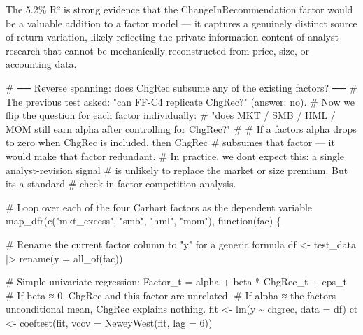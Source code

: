 \documentclass[
  letterpaper,
  DIV=11,
  numbers=noendperiod]{scrartcl}
\newenvironment{Shaded}{\begin{snugshade}}{\end{snugshade}}
\newcommand{\AttributeTok}[1]{\textcolor[rgb]{0.40,0.45,0.13}{#1}}
\newcommand{\CommentTok}[1]{\textcolor[rgb]{0.37,0.37,0.37}{#1}}
\newcommand{\ControlFlowTok}[1]{\textcolor[rgb]{0.00,0.23,0.31}{#1}}
\newcommand{\DecValTok}[1]{\textcolor[rgb]{0.68,0.00,0.00}{#1}}
\newcommand{\FunctionTok}[1]{\textcolor[rgb]{0.28,0.35,0.67}{#1}}
\newcommand{\NormalTok}[1]{\textcolor[rgb]{0.00,0.23,0.31}{#1}}
\newcommand{\OtherTok}[1]{\textcolor[rgb]{0.00,0.23,0.31}{#1}}
\newcommand{\SpecialCharTok}[1]{\textcolor[rgb]{0.37,0.37,0.37}{#1}}
\newcommand{\StringTok}[1]{\textcolor[rgb]{0.13,0.47,0.30}{#1}}
\begin{document}
The 5.2\% R² is strong evidence that the ChangeInRecommendation factor
would be a valuable addition to a factor model --- it captures a
genuinely distinct source of return variation, likely reflecting the
private information content of analyst research that cannot be
mechanically reconstructed from price, size, or accounting data.

\begin{Shaded}
\begin{Highlighting}[]
\CommentTok{\# ── Reverse spanning: does ChgRec subsume any of the existing factors? ──}
\CommentTok{\# The previous test asked: "can FF{-}C4 replicate ChgRec?" (answer: no).}
\CommentTok{\# Now we flip the question for each factor individually:}
\CommentTok{\# "does MKT / SMB / HML / MOM still earn alpha after controlling for ChgRec?"}
\CommentTok{\#}
\CommentTok{\# If a factor\textquotesingle{}s alpha drops to zero when ChgRec is included, then ChgRec}
\CommentTok{\# subsumes that factor — it would make that factor redundant.}
\CommentTok{\# In practice, we don\textquotesingle{}t expect this: a single analyst{-}revision signal}
\CommentTok{\# is unlikely to replace the market or size premium. But it\textquotesingle{}s a standard}
\CommentTok{\# check in factor competition analysis.}

\CommentTok{\# Loop over each of the four Carhart factors as the dependent variable}
\FunctionTok{map\_dfr}\NormalTok{(}\FunctionTok{c}\NormalTok{(}\StringTok{"mkt\_excess"}\NormalTok{, }\StringTok{"smb"}\NormalTok{, }\StringTok{"hml"}\NormalTok{, }\StringTok{"mom"}\NormalTok{), }\ControlFlowTok{function}\NormalTok{(fac) \{}
  
  \CommentTok{\# Rename the current factor column to "y" for a generic formula}
\NormalTok{  df }\OtherTok{\textless{}{-}}\NormalTok{ test\_data }\SpecialCharTok{|\textgreater{}} \FunctionTok{rename}\NormalTok{(}\AttributeTok{y =} \FunctionTok{all\_of}\NormalTok{(fac))}
  
  \CommentTok{\# Simple univariate regression: Factor\_t = alpha + beta * ChgRec\_t + eps\_t}
  \CommentTok{\# If beta ≈ 0, ChgRec and this factor are unrelated.}
  \CommentTok{\# If alpha ≈ the factor\textquotesingle{}s unconditional mean, ChgRec explains nothing.}
\NormalTok{  fit }\OtherTok{\textless{}{-}} \FunctionTok{lm}\NormalTok{(y }\SpecialCharTok{\textasciitilde{}}\NormalTok{ chgrec, }\AttributeTok{data =}\NormalTok{ df)}
\NormalTok{  ct }\OtherTok{\textless{}{-}} \FunctionTok{coeftest}\NormalTok{(fit, }\AttributeTok{vcov =} \FunctionTok{NeweyWest}\NormalTok{(fit, }\AttributeTok{lag =} \DecValTok{6}\NormalTok{))}
  

\end{Highlighting}
\end{Shaded}
\end{document}
